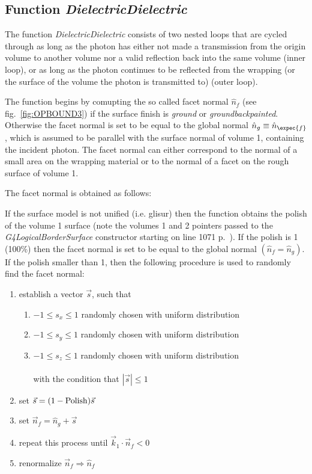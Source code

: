 \subsection{Function {\em DielectricDielectric}}

The function {\em DielectricDielectric} consists of two nested loops
that are cycled through as long as the photon has either not made a 
transmission from the origin volume to another volume nor a 
valid reflection back into the same volume (inner loop), or as long 
as the photon continues to be reflected from the wrapping (or the surface
of the volume the photon is transmitted to) (outer loop).

The function begins by comupting the so called facet normal
$\hat{n}_f$ (see fig.~\ref{fig:OPBOUND3}) if the surface finish is
{\em ground} or {\em groundbackpainted}. Otherwise the facet normal
is set to be equal to the global normal $\hat{n}_g \equiv \hat{n}_{\expec{f}}$,
which is assumed to be parallel with the surface normal of volume 1,
containing the incident photon. The facet normal can either correspond
to the normal of a small area on the wrapping  material or to the 
normal of a facet on the rough surface of volume 1.

The facet normal is obtained as follows:

If the surface model is not unified (i.e. glisur) then the function
obtains the polish of the volume 1 surface (note the volumes 1 and 2
pointers passed to the {\em G4LogicalBorderSurface} constructor
starting on line 1071 p.~\pageref{SourceV17}). If the polish is 1
(100\%) then the facet normal is set to be equal to the global normal
$(\hat{n}_f = \hat{n}_g)$. If the polish smaller than 1, then the 
following procedure is used to randomly find the facet normal:

\begin{enumerate}
  \item{establish a vector $\vec{s}$, such that
    \begin{enumerate}
      \item{$-1 \leq s_x \leq 1$ randomly chosen with uniform distribution}
      \item{$-1 \leq s_y \leq 1$ randomly chosen with uniform distribution}
      \item{$-1 \leq s_z \leq 1$ randomly chosen with uniform distribution \\
            \\
            with the condition that $|\vec{s}| \leq 1$}
    \end{enumerate}
  } 
  \item{set $\vec{s} = (1-{\rm Polish})\vec{s}$}
  \item{set $\vec{n}_f = \hat{n}_g + \vec{s}$}
  \item{repeat this process until $\vec{k}_1 \cdot \vec{n}_f < 0$}
  \item{renormalize $\vec{n}_f \Rightarrow \hat{n}_f$}
\end{enumerate}


